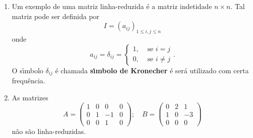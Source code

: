\begin{exemplo}
	\begin{enumerate}
		\item Um exemplo de uma matriz linha-reduzida \'e a matriz indetidade $n \times n$. Tal matriz pode ser definida por
		\[
			I = (a_{ij})_{1 \le i,j \le n}
		\]
		onde
		\[
			a_{ij} = \delta_{ij} = \begin{cases}
										1, & \mbox{ se } i = j\\
										0, & \mbox{ se } i \ne j 
									\end{cases}.
		\]
		O s{\'\i}mbolo $\delta_{ij}$ \'e chamada \textbf{s{\'\i}mbolo de Kronecher} \'e ser\'a utilizado com certa frequ\^encia.
		\item As matrizes
		\[
			A = \begin{pmatrix}
				1 & 0 & 0 & 0\\
				0 & 1 & -1 & 0\\
				0 & 0 & 1 & 0
			\end{pmatrix}; \quad B = \begin{pmatrix}
				0 & 2 & 1\\
				1 & 0 & -3\\
				0 & 0 & 0
			\end{pmatrix}
		\]
		n\~ao s\~ao linha-reduzidas.
	\end{enumerate}
\end{exemplo}


